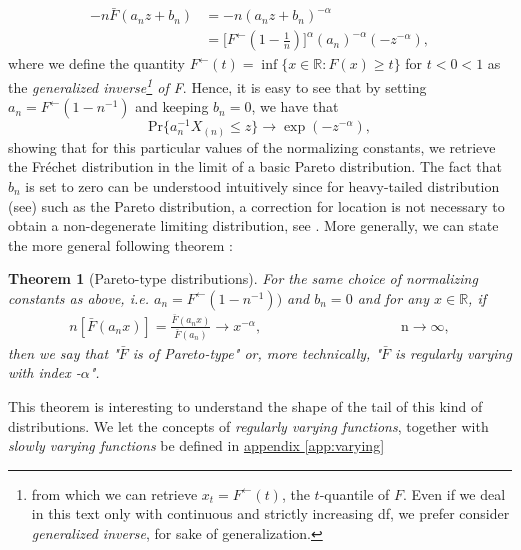 \documentclass[11pt,a4paper,openany ]{book}
\newtheorem{theorem}{Theorem}[chapter]
\begin{document}
\begin{equation*}
\begin{aligned}
-n\bar{F}(a_nz+b_n)
& =-n(a_nz+b_n)^{-\alpha} \\
& =\Big[F^{\leftarrow}(1-\frac{1}{n})\Big]^{\alpha}(a_n)^{-\alpha}(-z^{-\alpha}),
\end{aligned}
\end{equation*}
where we define the quantity $F^{\leftarrow}(t)=\inf\{x\in\mathbb{R}:F(x)\geq t\}$ for $t<0<1$ as the \emph{generalized inverse\footnote{from which we can retrieve $x_t=F^{\leftarrow}(t)$, the $t$-quantile of $F$. Even if we deal in this text only with continuous and strictly increasing df, we prefer consider \emph{generalized inverse}, for sake of generalization.} of F}.
Hence, it is easy to see that by setting $a_n=F^{\leftarrow}(1-n^{-1})$ and keeping $b_n=0$, we have that 
\begin{equation*}
\text{Pr}\{a_n^{-1}X_{(n)}\leq z\}\rightarrow \exp (-z^{-\alpha}),
\end{equation*}
showing that for this particular values of the normalizing constants, we retrieve the Fréchet distribution in the limit of a basic Pareto distribution. The fact that $b_n$ is set to zero can be understood intuitively since for heavy-tailed distribution (see) such as the Pareto distribution, a correction for location is not necessary to obtain a non-degenerate limiting distribution, see \citet[pp.51]{beirlant_practical_1996}.
More generally, we can state the more general following theorem :
\begin{theorem}[Pareto-type distributions] For the same choice of normalizing constants as above, i.e. $a_n=F^{\leftarrow}(1-n^{-1}))$ and $b_n=0$ and for any $x\in\mathbb{R}$, if
	\begin{equation}
	\begin{aligned}
	n[\bar{F}(a_nx)]= \frac{\bar{F}(a_nx)}{\bar{F}(a_n)}\rightarrow x^{-\alpha} ,&&&&&&&&&&&& \text{ n}\to\infty,
	\end{aligned}
	\end{equation}
	then we say that "\emph{$\bar{F}$ is of Pareto-type}" or, more technically, "\emph{$\bar{F}$ is regularly varying with index -$\alpha$}".
\end{theorem}

This theorem is interesting to understand the shape of the tail of this kind of distributions. 
We let the concepts of \emph{regularly varying functions}, together with \emph{slowly varying functions} be defined in \hyperref[app:varying]{appendix \ref{app:varying}}
\end{document}
